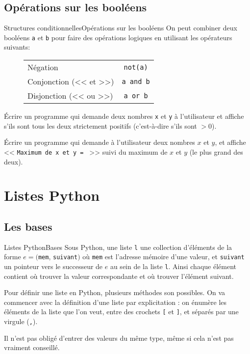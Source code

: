 \subsection{Opérations sur les booléens}
\begin{frame}[fragile]{Structures conditionnelles}{Opérations sur les booléens}
	On peut combiner deux booléens \lstinline|a| et \lstinline|b| pour faire des opérations logiques en utilisant les opérateurs suivants:\pause
	\begin{figure}
		\centering
		\begin{tabular}{|l|c|}\hline
			Négation & \lstinline|not(a)| \\
			Conjonction (<< et >>) & \lstinline|a and b| \\
			Disjonction (<< ou >>) & \lstinline|a or b| \\ \hline
		\end{tabular}
	\end{figure}
	\pause
	
	\begin{exo}
		Écrire un programme qui demande deux nombres \lstinline|x| et \lstinline|y| à l'utilisateur et affiche s'ils sont tous les deux strictement positifs (c'est-à-dire s'ils sont $>0$).
	\end{exo}
\end{frame}

\begin{frame}[fragile]
	\begin{exo}
		Écrire un programme qui demande à l'utilisateur deux nombres $x$ et $y$, et affiche << \lstinline|Maximum de x et y = | >> suivi du maximum de $x$ et $y$ (le plus grand des deux).
	\end{exo}
\end{frame}

\section{Listes Python}

\subsection{Les bases}

\begin{frame}[fragile]{Listes Python}{Bases}
	Sous Python, une liste \lstinline|l| une collection d'éléments de la forme $e = ($\lstinline|mem|, \lstinline|suivant|$)$ où \lstinline|mem| est l'adresse mémoire d'une valeur, et \lstinline|suivant| un pointeur vers le successeur de $e$ au sein de la liste \lstinline|l|. Ainsi chaque élément contient où trouver la valeur correspondante et où trouver l'élément suivant.
	\pause
	
	Pour définir une liste en Python, plusieurs méthodes son possibles. On va commencer avec la définition d'une liste par explicitation : on énumère les éléments de la liste que l'on veut, entre des crochets \lstinline|[| et \lstinline|]|, et séparés par une virgule (\lstinline|,|).
	\pause
	
	Il n'est pas obligé d'entrer des valeurs du même type, même si cela n'est pas vraiment conseillé.
\end{frame}

